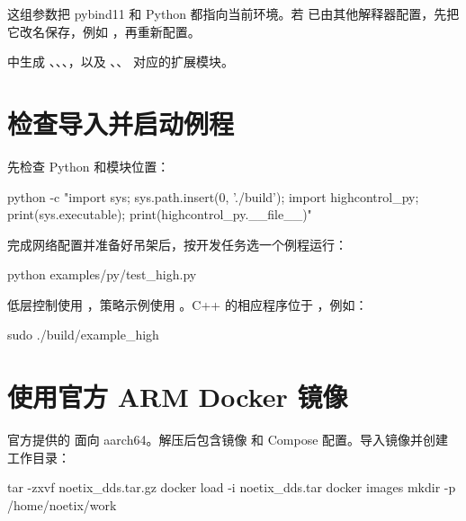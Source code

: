 这组参数把 pybind11 和 Python 都指向当前环境。若  已由其他解释器配置，先把它改名保存，例如 ，再重新配置。
\begin{expected}
 中生成 、、、，以及 、、 对应的扩展模块。
\end{expected}
\section{检查导入并启动例程}
先检查 Python 和模块位置：
\par\noindent\begin{minipage}{\linewidth}
\begin{command}
python -c "import sys; sys.path.insert(0, './build'); import highcontrol_py; print(sys.executable); print(highcontrol_py.__file__)"
\end{command}
\end{minipage}\par

完成网络配置并准备好吊架后，按开发任务选一个例程运行：
\par\noindent\begin{minipage}{\linewidth}
\begin{command}
python examples/py/test_high.py
\end{command}
\end{minipage}\par

低层控制使用 ，策略示例使用 。C++ 的相应程序位于 ，例如：
\par\noindent\begin{minipage}{\linewidth}
\begin{command}
sudo ./build/example_high
\end{command}
\end{minipage}\par

\section{使用官方 ARM Docker 镜像}
官方提供的  面向 aarch64。解压后包含镜像  和 Compose 配置。导入镜像并创建工作目录：
\par\noindent\begin{minipage}{\linewidth}
\begin{command}
tar -zxvf noetix_dds.tar.gz
docker load -i noetix_dds.tar
docker images
mkdir -p /home/noetix/work
\end{command}
\end{minipage}\par

